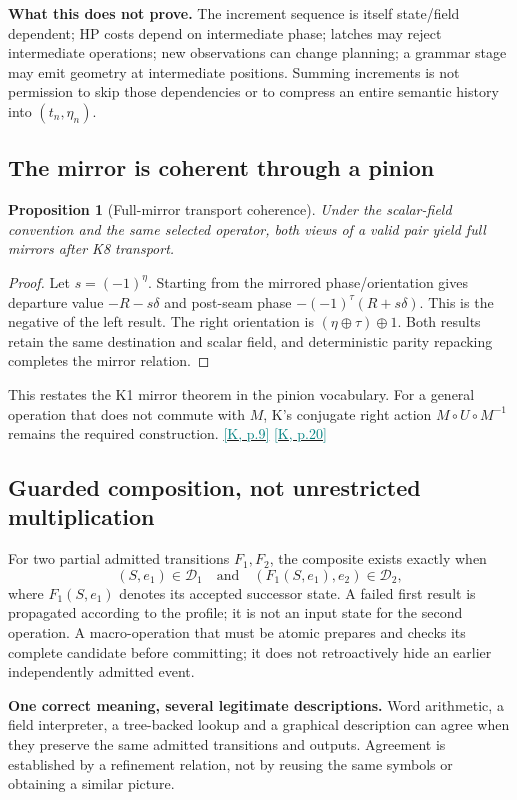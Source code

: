 \documentclass[11pt,a4paper]{article}
\newcommand{\kref}[1]{\hyperlink{baseline.#1}{\textcolor{teal}{[K, p.#1]}}}
\theoremstyle{lpstyle}
\newtheorem{theorem}{Proposition}[section]
\newcommand{\sbit}[1]{(-1)^{#1}}
\begin{document}
\textbf{What this does not prove.} The increment sequence is itself state/field dependent; HP costs depend on intermediate phase; latches may reject intermediate operations; new observations can change planning; a grammar stage may emit geometry at intermediate positions. Summing increments is not permission to skip those dependencies or to compress an entire semantic history into $(t_n,\eta_n)$.

\subsection{The mirror is coherent through a pinion}
\begin{theorem}[Full-mirror transport coherence]
Under the scalar-field convention and the same selected operator, both views of a valid pair yield full mirrors after K8 transport.
\end{theorem}
\begin{proof}
Let $s=\sbit{\eta}$. Starting from the mirrored phase/orientation gives departure value $-R-s\delta$ and post-seam phase $-\sbit{\tau}(R+s\delta)$. This is the negative of the left result. The right orientation is $(\eta\oplus\tau)\oplus1$. Both results retain the same destination and scalar field, and deterministic parity repacking completes the mirror relation.
\end{proof}
This restates the K1 mirror theorem in the pinion vocabulary. For a general operation that does not commute with $M$, K's conjugate right action $M\circ U\circ M^{-1}$ remains the required construction. \kref{9} \kref{20}

\subsection{Guarded composition, not unrestricted multiplication}
For two partial admitted transitions $F_1,F_2$, the composite exists exactly when
\[
(S,e_1)\in\mathcal D_1
\quad\text{and}\quad
(F_1(S,e_1),e_2)\in\mathcal D_2,
\]
where $F_1(S,e_1)$ denotes its accepted successor state. A failed first result is propagated according to the profile; it is not an input state for the second operation. A macro-operation that must be atomic prepares and checks its complete candidate before committing; it does not retroactively hide an earlier independently admitted event.

\begin{principle}
\textbf{One correct meaning, several legitimate descriptions.} Word arithmetic, a field interpreter, a tree-backed lookup and a graphical description can agree when they preserve the same admitted transitions and outputs. Agreement is established by a refinement relation, not by reusing the same symbols or obtaining a similar picture.
\end{principle}
\end{document}
